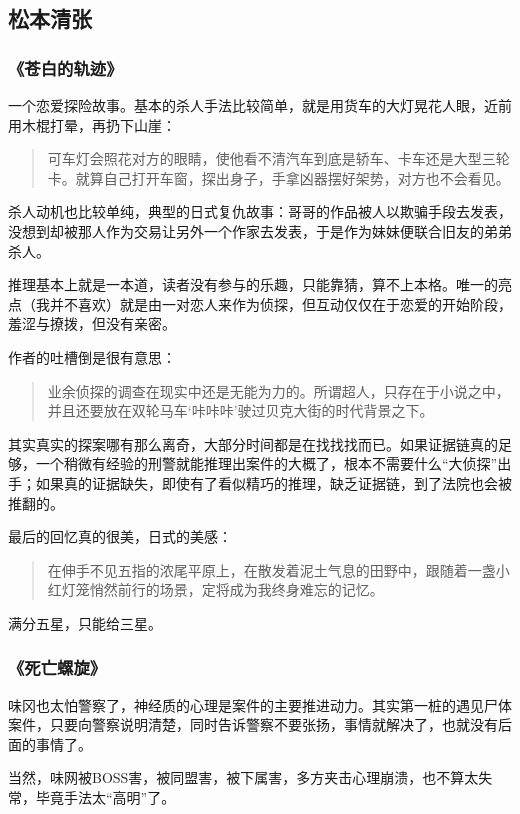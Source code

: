 \subsection{松本清张}
\subsubsection{《苍白的轨迹》}
一个恋爱探险故事。基本的杀人手法比较简单，就是用货车的大灯晃花人眼，近前用木棍打晕，再扔下山崖：

\begin{quotation}
可车灯会照花对方的眼睛，使他看不清汽车到底是轿车、卡车还是大型三轮卡。就算自己打开车窗，探出身子，手拿凶器摆好架势，对方也不会看见。
\end{quotation}

杀人动机也比较单纯，典型的日式复仇故事：哥哥的作品被人以欺骗手段去发表，没想到却被那人作为交易让另外一个作家去发表，于是作为妹妹便联合旧友的弟弟杀人。
 
推理基本上就是一本道，读者没有参与的乐趣，只能靠猜，算不上本格。唯一的亮点（我并不喜欢）就是由一对恋人来作为侦探，但互动仅仅在于恋爱的开始阶段，羞涩与撩拨，但没有亲密。

作者的吐槽倒是很有意思：
\begin{quotation}
业余侦探的调查在现实中还是无能为力的。所谓超人，只存在于小说之中，并且还要放在双轮马车‘咔咔咔’驶过贝克大街的时代背景之下。
\end{quotation}
其实真实的探案哪有那么离奇，大部分时间都是在找找找而已。如果证据链真的足够，一个稍微有经验的刑警就能推理出案件的大概了，根本不需要什么“大侦探”出手；如果真的证据缺失，即使有了看似精巧的推理，缺乏证据链，到了法院也会被推翻的。

最后的回忆真的很美，日式的美感：
\begin{quotation}
在伸手不见五指的浓尾平原上，在散发着泥土气息的田野中，跟随着一盏小红灯笼悄然前行的场景，定将成为我终身难忘的记忆。
\end{quotation}
 
满分五星，只能给三星。

\subsubsection{《死亡螺旋》}
味冈也太怕警察了，神经质的心理是案件的主要推进动力。其实第一桩的遇见尸体案件，只要向警察说明清楚，同时告诉警察不要张扬，事情就解决了，也就没有后面的事情了。 

当然，味网被BOSS害，被同盟害，被下属害，多方夹击心理崩溃，也不算太失常，毕竟手法太“高明”了。 

